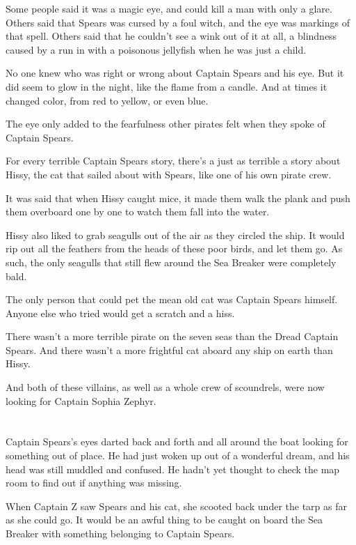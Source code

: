 \documentclass[12pt]{extbook}
\begin{document}
  Some people said it was a magic eye, and could kill a man with only a
  glare. Others said that Spears was cursed by a foul witch, and the eye
  was markings of that spell. Others said that he couldn't see a wink out
  of it at all, a blindness caused by a run in with a poisonous jellyfish
  when he was just a child.
  
  No one knew who was right or wrong about Captain Spears and his eye. But
  it did seem to glow in the night, like the flame from a candle. And at
  times it changed color, from red to yellow, or even blue.
  
  The eye only added to the fearfulness other pirates felt when they spoke
  of Captain Spears.
  
  For every terrible Captain Spears story, there's a just as terrible a
  story about Hissy, the cat that sailed about with Spears, like one of
  his own pirate crew.
  
  It was said that when Hissy caught mice, it made them walk the plank and
  push them overboard one by one to watch them fall into the water.
  
  Hissy also liked to grab seagulls out of the air as they circled the
  ship. It would rip out all the feathers from the heads of these poor
  birds, and let them go. As such, the only seagulls that still flew
  around the Sea Breaker were completely bald.
  
  The only person that could pet the mean old cat was Captain Spears
  himself. Anyone else who tried would get a scratch and a hiss.
  
  There wasn't a more terrible pirate on the seven seas than the Dread
  Captain Spears. And there wasn't a more frightful cat aboard any ship on
  earth than Hissy.
  
  And both of these villains, as well as a whole crew of scoundrels, were
  now looking for Captain Sophia Zephyr.
  
  \section{}\label{section-6}
  
  Captain Spears's eyes darted back and forth and all around the boat
  looking for something out of place. He had just woken up out of a
  wonderful dream, and his head was still muddled and confused. He hadn't
  yet thought to check the map room to find out if anything was missing.
  
  When Captain Z saw Spears and his cat, she scooted back under the tarp
  as far as she could go. It would be an awful thing to be caught on board
  the Sea Breaker with something belonging to Captain Spears.
  
\end{document}
